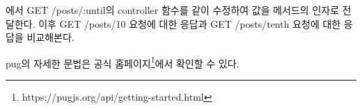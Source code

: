 에서 GET /posts/:until의 controller 함수를 \와 같이 수정하여  값을  메서드의 인자로 전달한다. 이후 GET /posts/10 요청에 대한 응답과 GET /posts/tenth 요청에 대한 응답을 비교해본다.

pug의 자세한 문법은 공식 홈페이지\footnote{https://pugjs.org/api/getting-started.html}에서 확인할 수 있다.
